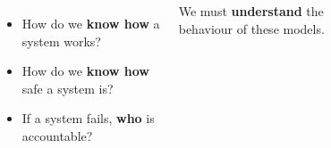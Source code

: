 \begin{frame}[t]
\begin{columns}[t]
\begin{figure}
        \end{figure}
            \begin{itemize}
                \item How do we \textbf{know how} a system works?\pause
                \item How do we \textbf{know how} safe a system is?\pause
                \item If a system fails, \textbf{who} is accountable?
            \end{itemize}
            We must \textbf{understand} the behaviour of these models.
        \end{columns}
 \end{frame}

